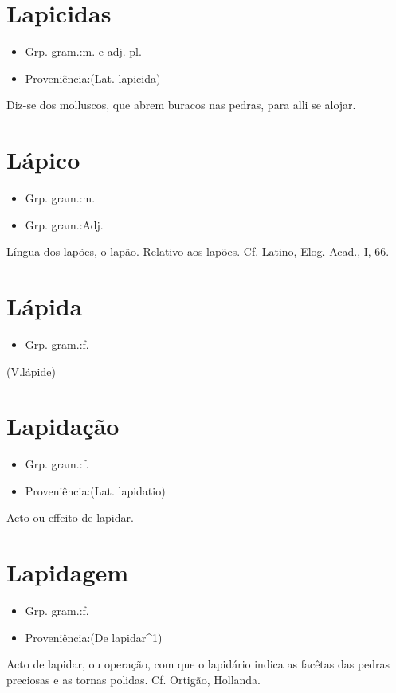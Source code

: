 \section{Lapicidas}
\begin{itemize}
\item {Grp. gram.:m.  e  adj. pl.}
\end{itemize}
\begin{itemize}
\item {Proveniência:(Lat. \textunderscore lapicida\textunderscore )}
\end{itemize}
Diz-se dos molluscos, que abrem buracos nas pedras, para alli se alojar.
\section{Lápico}
\begin{itemize}
\item {Grp. gram.:m.}
\end{itemize}
\begin{itemize}
\item {Grp. gram.:Adj.}
\end{itemize}
Língua dos lapões, o lapão.
Relativo aos lapões. Cf. Latino, \textunderscore Elog. Acad.\textunderscore , I, 66.
\section{Lápida}
\begin{itemize}
\item {Grp. gram.:f.}
\end{itemize}
(V.lápide)
\section{Lapidação}
\begin{itemize}
\item {Grp. gram.:f.}
\end{itemize}
\begin{itemize}
\item {Proveniência:(Lat. \textunderscore lapidatio\textunderscore )}
\end{itemize}
Acto ou effeito de lapidar.
\section{Lapidagem}
\begin{itemize}
\item {Grp. gram.:f.}
\end{itemize}
\begin{itemize}
\item {Proveniência:(De \textunderscore lapidar\textunderscore ^1)}
\end{itemize}
Acto de lapidar, ou operação, com que o lapidário indica as facêtas das pedras preciosas e as tornas polidas. Cf. Ortigão, \textunderscore Hollanda\textunderscore .
